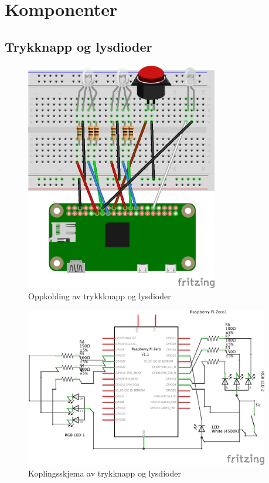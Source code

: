 \section{Komponenter}

\subsection{Trykknapp og lysdioder}

\begin{figure}
\includegraphics[width=0.75\textwidth, center]{fig/prototype/breadbord}
\caption{Oppkobling av trykkknapp og lysdioder}
\label{fig:breadboard}
\end{figure}

\begin{figure}
\includegraphics[width=0.95\textwidth, center]{fig/prototype/schmeatic}
\caption{Koplingsskjema av trykknapp og lysdioder}
\label{fig:schematics}
\end{figure}

